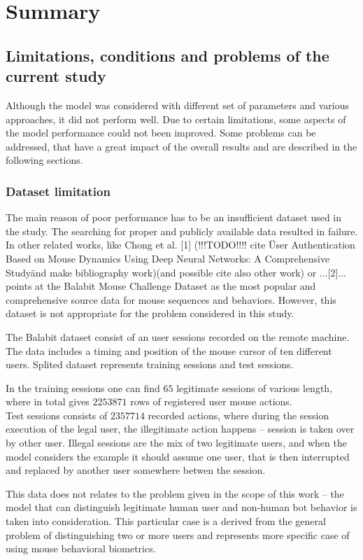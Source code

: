 \chapter{Summary}

\section{Limitations, conditions and problems of the current study}
Although the model was considered with different set of parameters and various approaches, it did not perform well.
Due to certain limitations, some aspects of the model performance could not been improved.
Some problems can be addressed, that have a great impact of the overall results and are described in the following sections.

\subsection{Dataset limitation}
The main reason of poor performance has to be an insufficient dataset used in the study.
The searching for proper and publicly available data resulted in failure.
In other related works, like Chong et al. [1] (!!!TODO!!!! cite \"User Authentication Based on Mouse Dynamics Using Deep Neural Networks:
A Comprehensive Study\" and make bibliography work)(and possible cite also other work) or ...[2]... points at the Balabit Mouse Challenge Dataset as the most popular and comprehensive source data for mouse sequences and behaviors.
However, this dataset is not appropriate for the problem considered in this study.

The Balabit dataset consist of an user sessions recorded on the remote machine. The data includes a timing and position of the mouse cursor of ten different users.
Splited dataset represents training sessions and test sessions.

In the training sessions one can find $65$ legitimate sessions of various length, where in total gives $2253871$ rows of registered user mouse actions.\\
Test sessions consists of $2357714$ recorded actions, where during the session execution of the legal user, the illegitimate action happens – session is taken over by other user. Illegal sessions are the mix of two legitimate users, and when the model considers the example it should assume one user, that is then interrupted and replaced by another user somewhere betwen the session.

This data does not relates to the problem given in the scope of this work – the model that can distinguish legitimate human user and non-human bot behavior is taken into consideration. This particular case is a derived from the general problem of distinguishing two or more users and represents more specific case of using mouse behavioral biometrics.

